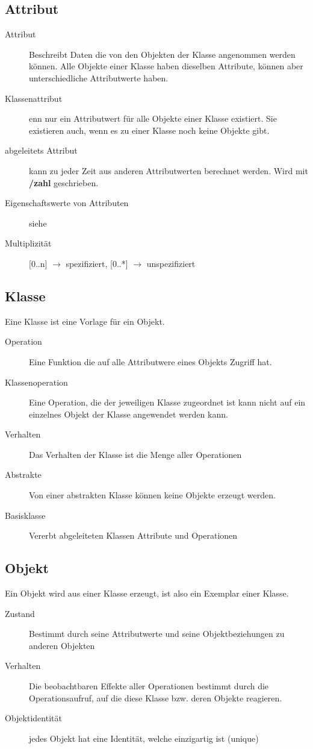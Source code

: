 \subsection{Attribut }
  \begin{description}
    \item[Attribut] 
      Beschreibt Daten die von den Objekten der Klasse angenommen
      werden können. Alle Objekte einer Klasse haben dieselben Attribute, können
      aber unterschiedliche Attributwerte haben.
    \item[Klassenattribut] 
      enn nur ein Attributwert für alle Objekte einer Klasse
      existiert. Sie existieren auch, wenn es zu einer Klasse noch keine Objekte gibt.
    \item[abgeleitets Attribut]
      kann zu jeder Zeit aus anderen Attributwerten berechnet werden. Wird mit \textbf{/zahl} geschrieben.  
    \item[Eigenschaftswerte von Attributen]
      siehe       
    \item[Multiplizität]
      [0..n] $\rightarrow$ spezifiziert, [0..*] $\rightarrow$ unspezifiziert
  \end{description}
  
\subsection{Klasse }
  Eine Klasse ist eine Vorlage für ein Objekt.
  \begin{description}
    \item[Operation] 
      Eine Funktion die auf alle Attributwere eines Objekts Zugriff hat.
    \item[Klassenoperation] 
      Eine Operation, die der jeweiligen Klasse zugeordnet ist kann nicht auf 
      ein einzelnes Objekt der Klasse angewendet werden kann. 
    \item[Verhalten] 
      Das Verhalten der Klasse ist die Menge aller Operationen
    \item[Abstrakte] 
      Von einer abstrakten Klasse können keine Objekte erzeugt werden.
    \item[Basisklasse] 
      Vererbt abgeleiteten Klassen Attribute und Operationen
  \end{description}
  
\subsection{Objekt }
	Ein Objekt wird aus einer Klasse erzeugt, ist also ein Exemplar einer Klasse.
	\begin{description}
		\item[Zustand] 
      Bestimmt durch seine Attributwerte und seine Objektbeziehungen zu anderen Objekten
		\item[Verhalten] 
      Die beobachtbaren Effekte aller Operationen bestimmt durch die Operationsaufruf, 
      auf die diese Klasse bzw. deren Objekte reagieren.
		\item[Objektidentität] 
      jedes Objekt hat eine Identität, welche einzigartig ist (unique)
	\end{description}
	
